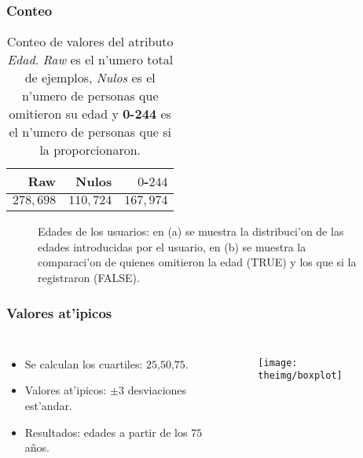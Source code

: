 \documentclass{beamer}
\begin{document}
\begin{frame}[label=conteo]
\frametitle{Conteo}
\begin{table}[ht]
\begin{center}
\begin{tabular}{|r|r|r|} \hline
\textbf{Raw} & \textbf{Nulos} & $0$-$244$ \\ [0.5ex]\hline
$278,698$ & $110,724$ & $167,974$ \\\hline
\end{tabular}
\caption{Conteo de valores del atributo \textit{Edad}. \textit{Raw} es el n'umero total de ejemplos, \textit{Nulos} es el n'umero de personas que omitieron su edad y \textbf{0-244} es el n'umero de personas que si la proporcionaron.}
\label{tab:conteo}
\end{center}
\end{table}

\vspace{-0.3cm}

\begin{figure}[h]
    \begin{center}
    \hspace{0.01cm}
    
    \caption{Edades de los usuarios: en (a) se muestra la distribuci'on de las edades introducidas por el usuario, en (b) se muestra la comparaci'on de quienes omitieron la edad (TRUE) y los que si la registraron (FALSE).}
    \label{fig:gruposedades}
    \end{center}
\end{figure}
\end{frame}
\begin{frame}[label=atipicos]
\frametitle{Valores at'ipicos}
\begin{columns}[T]
    \begin{itemize}
    \setlength\itemsep{0.7cm}
    \item Se calculan los cuartiles: $25$,$50$,$75$.
    \item Valores at'ipicos: $\pm 3$ desviaciones est'andar.
    \item Resultados: edades a partir de los $75$ a\~{n}os.
    \end{itemize}
        
    \vspace{-0.4cm}
    \begin{figure}[h]
        \centering
        \texttt{[image: theimg/boxplot]}
    \end{figure}  
\end{columns}
\end{frame}
\end{document}
